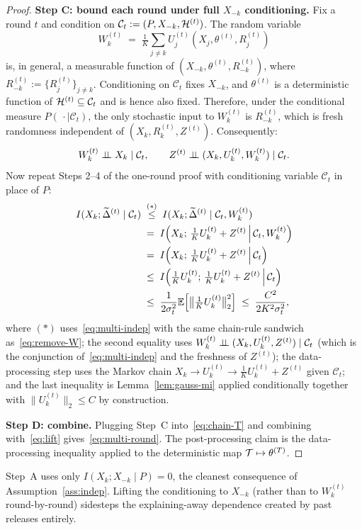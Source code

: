 \begin{proof}
\textbf{Step C: bound each round under full \(X_{-k}\) conditioning.}
Fix a round \(t\) and condition on \(\mathcal C_t := (P,X_{-k},\mathcal{H}^{(t)})\). The random variable
\[
W_k^{(t)} \;=\; \tfrac{1}{K}\sum_{j\ne k}U_j^{(t)}\!\left(X_j,\theta^{(t)},R_j^{(t)}\right)
\]
is, in general, a measurable function of \((X_{-k},\theta^{(t)},R_{-k}^{(t)})\), where \(R_{-k}^{(t)}:=\{R_j^{(t)}\}_{j\ne k}\). Conditioning on \(\mathcal C_t\) fixes \(X_{-k}\), and \(\theta^{(t)}\) is a deterministic function of \(\mathcal{H}^{(t)}\subseteq\mathcal C_t\) and is hence also fixed. Therefore, under the conditional measure \(P(\,\cdot\mid\mathcal C_t)\), the only stochastic input to \(W_k^{(t)}\) is \(R_{-k}^{(t)}\), which is fresh randomness independent of \((X_k,R_k^{(t)},Z^{(t)})\). Consequently:
\begin{equation}\label{eq:multi-indep}
W_k^{(t)} \perp\!\!\!\perp X_k \mid \mathcal C_t, \qquad Z^{(t)}\perp\!\!\!\perp(X_k,U_k^{(t)},W_k^{(t)})\mid \mathcal C_t.
\end{equation}
Now repeat Steps 2--4 of the one-round proof with conditioning variable \(\mathcal C_t\) in place of \(P\):
\begin{align*}
I(X_k;\widetilde{\Delta}^{(t)}\mid\mathcal C_t)
&\;\stackrel{(*)}{\le}\; I(X_k;\widetilde{\Delta}^{(t)}\mid\mathcal C_t,W_k^{(t)})\\
&\;=\;I\!\left(X_k;\,\tfrac{1}{K}U_k^{(t)}+Z^{(t)}\,\middle|\,\mathcal C_t,W_k^{(t)}\right)\\
&\;=\;I\!\left(X_k;\,\tfrac{1}{K}U_k^{(t)}+Z^{(t)}\,\middle|\,\mathcal C_t\right)\\
&\;\le\; I\!\left(\tfrac{1}{K}U_k^{(t)};\,\tfrac{1}{K}U_k^{(t)}+Z^{(t)}\,\middle|\,\mathcal C_t\right) \\
&\;\le\;\frac{1}{2\sigma_t^2}\mathbb{E}\!\left[\bigl\|\tfrac{1}{K}U_k^{(t)}\bigr\|_2^2\right]
\;\le\;\frac{C^2}{2K^2\sigma_t^2},
\end{align*}
where \((*)\) uses~\eqref{eq:multi-indep} with the same chain-rule sandwich as~\eqref{eq:remove-W}; the second equality uses \(W_k^{(t)}\perp\!\!\!\perp(X_k,U_k^{(t)},Z^{(t)})\mid\mathcal C_t\) (which is the conjunction of~\eqref{eq:multi-indep} and the freshness of \(Z^{(t)}\)); the data-processing step uses the Markov chain \(X_k\to U_k^{(t)}\to \tfrac{1}{K}U_k^{(t)}+Z^{(t)}\) given \(\mathcal C_t\); and the last inequality is Lemma~\ref{lem:gauss-mi} applied conditionally together with \(\|U_k^{(t)}\|_2\le C\) by construction.

\textbf{Step D: combine.}
Plugging Step~C into~\eqref{eq:chain-T} and combining with~\eqref{eq:lift} gives~\eqref{eq:multi-round}. The post-processing claim is the data-processing inequality applied to the deterministic map \(\mathcal{T}\mapsto\theta^{(T)}\).
\end{proof}

\begin{remark}
Step~A uses only \(I(X_k;X_{-k}\mid P)=0\), the cleanest consequence of Assumption~\ref{ass:indep}. Lifting the conditioning to \(X_{-k}\) (rather than to \(W_k^{(t)}\) round-by-round) sidesteps the explaining-away dependence created by past releases entirely.
\end{remark}
